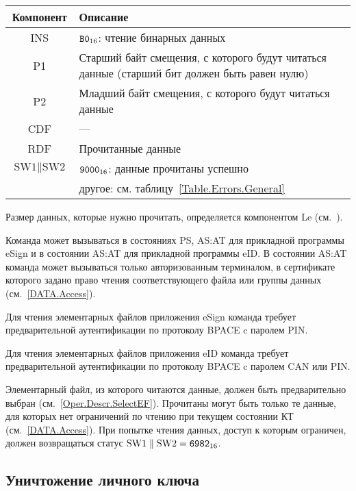 \begin{table}[hbt]
\caption{}\label{Table.Oper.ReadCmd}
\begin{tabular}{|c|p{14cm}|}
\hline
Компонент & Описание \\
\hline
\hline
INS & $\texttt{B0}_{16}$: чтение бинарных данных \\
\hline
P1 & Старший байт смещения, с которого будут читаться данные (старший бит 
должен быть равен нулю) \\
\hline
P2 & Младший байт смещения, с которого будут читаться данные\\
\hline
CDF &  --- \\
\hline 
RDF & 	Прочитанные данные \\
\hline
$\text{SW1} \parallel\text{SW2}$ & 
$\texttt{9000}_{16}$: данные прочитаны успешно \\
& другое: см. таблицу~\ref{Table.Errors.General} \\
\hline
\end{tabular}
\end{table}

Размер данных, которые нужно прочитать, определяется компонентом 
Le (см.~\cite{APDU}).

Команда может вызываться в состояниях PS, AS:AT 
для прикладной программы eSign и в состоянии 
AS:AT для прикладной программы eID.
В состоянии AS:AT команда может вызываться только 
авторизованным терминалом, в сертификате которого
задано право чтения соответствующего файла или группы данных
(см.~\ref{DATA.Access}).

Для чтения элементарных файлов приложения eSign команда требует 
предварительной аутентификации по протоколу BPACE c 
паролем PIN.

Для чтения элементарных файлов приложения eID команда требует 
предварительной аутентификации по протоколу BPACE c 
паролем CAN или PIN.

Элементарный файл, из которого читаются данные, должен быть предварительно 
выбран (см.~\ref{Oper.Descr.SelectEF}). Прочитаны могут быть только те данные, 
для которых нет ограничений по чтению при текущем состоянии КТ (см.~\ref{DATA.Access}). 
При попытке чтения данных, доступ к которым ограничен, должен возвращаться 
статус $\text{SW1} \parallel \text{SW2} = \texttt{6982}_{16}$.

\subsection{Уничтожение личного ключа}
\label{Oper.Descr.Terminate}

